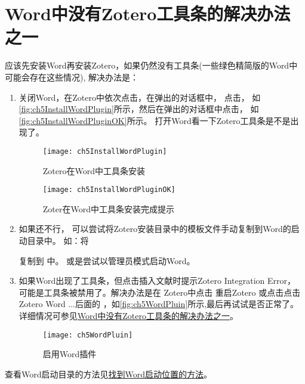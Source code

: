 \documentclass[cn,11pt,chinese]{elegantbook}
\begin{document}
    	\section{Word中没有Zotero工具条的解决办法之一}\label{sec:tool_bar}
	    	应该先安装Word再安装Zotero，如果仍然没有工具条(一些绿色精简版的Word中可能会存在这些情况),	    	
			解决办法是：
			\begin{enumerate}
				\item 关闭Word，在Zotero中依次点击，在弹出的对话框中，
				点击，
				如\autoref{fig:ch5InstallWordPlugin}所示，然后在弹出的对话框中点击，
				如\autoref{fig:ch5InstallWordPluginOK}所示。
				打开Word看一下Zotero工具条是不是出现了。
			 
						\begin{figure}[htbp]
							\centering
							\texttt{[image: ch5InstallWordPlugin]}
							\caption{Zotero在Word中工具条安装}
							\label{fig:ch5InstallWordPlugin}
							\end{figure}
						
						\begin{figure}[htbp]
							\centering
							\texttt{[image: ch5InstallWordPluginOK]}
							\caption{Zoter在Word中工具条安装完成提示}
							\label{fig:ch5InstallWordPluginOK}
							\end{figure}
				\item 如果还不行，
			可以尝试将Zotero安装目录中的模板文件手动复制到Word的启动目录中。
	    	如：将
			
			复制到 
			中。
			或是尝试以管理员模式启动Word。
	    		
			   \item 如果Word出现了工具条，但点击插入文献时提示Zotero Integration Error，
			   可能是工具条被禁用了。解决办法是在
			   Zotero中点击 重启Zotero
			   或点击点击Zotero Word ...后面的 
			   ，如\autoref{fig:ch5WordPluin}所示,最后再试试是否正常了。
			   详细情况可参见\href{https://zhuanlan.zhihu.com/p/58931999}
			   {Word中没有Zotero工具条的解决办法之一}。
		    		\begin{figure}[htbp]
		    				\centering
		    				\texttt{[image: ch5WordPluin]}
		    				\caption{启用Word插件}
		    				\label{fig:ch5WordPluin}
		    		\end{figure}	
			\end{enumerate}
				查看Word启动目录的方法见\href{https://zhuanlan.zhihu.com/p/85513418}
				{找到Word启动位置的方法}。
		
\end{document}
